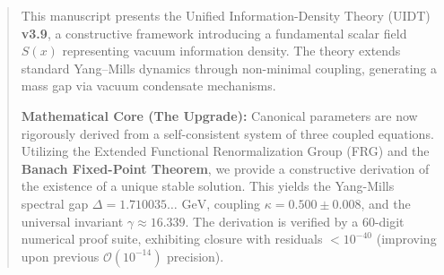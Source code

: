 \documentclass[12pt,a4paper,twoside]{article}
\theoremstyle{plain}
\theoremstyle{definition}
\theoremstyle{remark}
\newcommand{\UIDT}{\textsc{UIDT}}
\newcommand{\GeV}{\,\mathrm{GeV}}
\begin{document}
\begin{abstract}
\noindent
This manuscript presents the Unified Information-Density Theory (\UIDT{})
\textbf{v3.9}, a constructive framework introducing a fundamental
scalar field $S(x)$ representing vacuum information density. The theory extends
standard Yang--Mills dynamics through non-minimal coupling, generating a mass
gap via vacuum condensate mechanisms.

\vspace{0.7em}
\noindent
\textbf{Mathematical Core (The Upgrade):}
Canonical parameters are now rigorously derived from a self-consistent system
of three coupled equations. Utilizing the Extended Functional Renormalization
Group (FRG) and the \textbf{Banach Fixed-Point Theorem}, we provide a
constructive derivation of the existence of a unique stable solution. This yields
the Yang-Mills spectral gap $\Delta = 1.710035\dots\,\GeV$, coupling
$\kappa = 0.500 \pm 0.008$, and the universal invariant
$\gamma \approx 16.339$. The derivation is verified by a 60-digit numerical
proof suite, exhibiting closure with residuals $< 10^{-40}$ (improving upon
previous $\mathcal{O}(10^{-14})$ precision).


\end{abstract}
\end{document}
